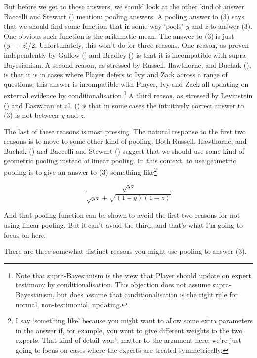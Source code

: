 \documentclass[
  11pt,
  letterpaper,
  DIV=11,
  numbers=noendperiod,
  twoside]{scrartcl}
\begin{document}
But before we get to those answers, we should look at the other kind of
answer Baccelli and Stewart ()
mention: pooling answers. A pooling answer to (3) says that we should
find some function that in some way `pools' \emph{y} and \emph{z} to
answer (3). One obvious such function is the arithmetic mean. The answer
to (3) is just (\emph{y}~+~\emph{z})/2. Unfortunately, this won't do for
three reasons. One reason, as proven independently by Gallow
() and Bradley
() is that it is incompatible with
supra-Bayesianism. A second reason, as stressed by Russell, Hawthorne,
and Buchak (), is that it is in
cases where Player defers to Ivy and Zack across a range of questions,
this answer is incompatible with Player, Ivy and Zack all updating on
external evidence by conditionalisation.\footnote{Note that
  supra-Bayesianism is the view that Player should update on expert
  testimony by conditionalisation. This objection does not assume
  supra-Bayesianism, but does assume that conditionalisation is the
  right rule for normal, non-testimonial, updating.} A third reason, as
stressed by Levinstein () and
Easwaran et al. () is that in some
cases the intuitively correct answer to (3) is not between \emph{y} and
\emph{z}.

The last of these reasons is most pressing. The natural response to the
first two reasons is to move to some other kind of pooling. Both
Russell, Hawthorne, and Buchak ()
and Baccelli and Stewart ()
suggest that we should use some kind of geometric pooling instead of
linear pooling. In this context, to use geometric pooling is to give an
answer to (3) something like\footnote{I say `something like' because you
  might want to allow some extra parameters in the answer if, for
  example, you want to give different weights to the two experts. That
  kind of detail won't matter to the argument here; we're just going to
  focus on cases where the experts are treated symmetrically.}

\[
\frac{\sqrt{yz}}{\sqrt{yz} + {\sqrt{(1-y)(1-z)}}}
\]

And that pooling function can be shown to avoid the first two reasons
for not using linear pooling. But it can't avoid the third, and that's
what I'm going to focus on here.

There are three somewhat distinct reasons you might use pooling to
answer (3).
\end{document}
